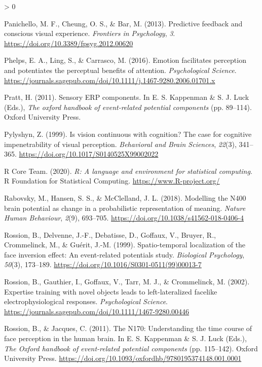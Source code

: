 \documentclass[
  english,
  doc,12pt,twoside,floatsintext]{apa7}
\newlength{\cslhangindent}
\newenvironment{CSLReferences}[2] %
 {%
  \setlength{\parindent}{0pt}
  \ifodd #1 \everypar{\setlength{\hangindent}{\cslhangindent}}\ignorespaces\fi
  \ifnum #2 > 0
  \setlength{\parskip}{#2\baselineskip}
  \fi
 }%
 {}
\begin{document}
\begin{CSLReferences}{1}{0}
\leavevmode\hypertarget{ref-panichello2013}{}%
Panichello, M. F., Cheung, O. S., \& Bar, M. (2013). Predictive feedback and conscious visual experience. \emph{Frontiers in Psychology}, \emph{3}. \url{https://doi.org/10.3389/fpsyg.2012.00620}

\leavevmode\hypertarget{ref-phelps2016}{}%
Phelps, E. A., Ling, S., \& Carrasco, M. (2016). Emotion facilitates perception and potentiates the perceptual benefits of attention. \emph{Psychological Science}. \url{https://journals.sagepub.com/doi/10.1111/j.1467-9280.2006.01701.x}

\leavevmode\hypertarget{ref-pratt2011}{}%
Pratt, H. (2011). Sensory ERP components. In E. S. Kappenman \& S. J. Luck (Eds.), \emph{The oxford handbook of event-related potential components} (pp. 89--114). Oxford University Press.

\leavevmode\hypertarget{ref-pylyshyn1999}{}%
Pylyshyn, Z. (1999). Is vision continuous with cognition? The case for cognitive impenetrability of visual perception. \emph{Behavioral and Brain Sciences}, \emph{22}(3), 341--365. \url{https://doi.org/10.1017/S0140525X99002022}

\leavevmode\hypertarget{ref-R-base}{}%
R Core Team. (2020). \emph{R: A language and environment for statistical computing}. R Foundation for Statistical Computing. \url{https://www.R-project.org/}

\leavevmode\hypertarget{ref-rabovsky2018}{}%
Rabovsky, M., Hansen, S. S., \& McClelland, J. L. (2018). Modelling the {N400} brain potential as change in a probabilistic representation of meaning. \emph{Nature Human Behaviour}, \emph{2}(9), 693--705. \url{https://doi.org/10.1038/s41562-018-0406-4}

\leavevmode\hypertarget{ref-rossion1999}{}%
Rossion, B., Delvenne, J.-F., Debatisse, D., Goffaux, V., Bruyer, R., Crommelinck, M., \& Guérit, J.-M. (1999). Spatio-temporal localization of the face inversion effect: An event-related potentials study. \emph{Biological Psychology}, \emph{50}(3), 173--189. \url{https://doi.org/10.1016/S0301-0511(99)00013-7}

\leavevmode\hypertarget{ref-rossion2002}{}%
Rossion, B., Gauthier, I., Goffaux, V., Tarr, M. J., \& Crommelinck, M. (2002). Expertise training with novel objects leads to left-lateralized facelike electrophysiological responses. \emph{Psychological Science}. \url{https://journals.sagepub.com/doi/10.1111/1467-9280.00446}

\leavevmode\hypertarget{ref-rossion2011}{}%
Rossion, B., \& Jacques, C. (2011). The {N170}: Understanding the time course of face perception in the human brain. In E. S. Kappenman \& S. J. Luck (Eds.), \emph{The {Oxford} handbook of event-related potential components} (pp. 115--142). Oxford University Press. \url{https://doi.org/10.1093/oxfordhb/9780195374148.001.0001}


\end{CSLReferences}
\end{document}
